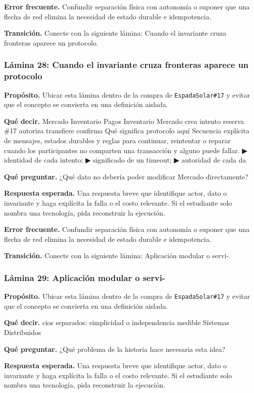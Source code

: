 \documentclass[variant=docente,cover=institutional,mode=screen]{ua-engineering-v6-article}
\begin{document}
\textbf{Error frecuente.} Confundir separación física con autonomía o suponer que una flecha de red elimina la necesidad de estado durable e idempotencia.

\textbf{Transición.} Conecte con la siguiente lámina: Cuando el invariante cruza fronteras aparece un protocolo.

\subsubsection*{Lámina 28: Cuando el invariante cruza fronteras aparece un protocolo}
\textbf{Propósito.} Ubicar esta lámina dentro de la compra de \texttt{EspadaSolar\#17} y evitar que el concepto se convierta en una definición aislada.

\textbf{Qué decir.} Mercado Inventario Pagos Inventario Mercado crea intento reserva \#17 autoriza transfiere confirma Qué significa protocolo aquí Secuencia explícita de mensajes, estados durables y reglas para continuar, reintentar o reparar cuando los participantes no comparten una transacción y alguno puede fallar. ▶ identidad de cada intento; ▶ significado de un timeout; ▶ autoridad de cada da

\textbf{Qué preguntar.} ¿Qué dato no debería poder modificar Mercado directamente?

\textbf{Respuesta esperada.} Una respuesta breve que identifique actor, dato o invariante y haga explícita la falla o el costo relevante. Si el estudiante solo nombra una tecnología, pida reconstruir la ejecución.

\textbf{Error frecuente.} Confundir separación física con autonomía o suponer que una flecha de red elimina la necesidad de estado durable e idempotencia.

\textbf{Transición.} Conecte con la siguiente lámina: Aplicación modular o servi-.

\subsubsection*{Lámina 29: Aplicación modular o servi-}
\textbf{Propósito.} Ubicar esta lámina dentro de la compra de \texttt{EspadaSolar\#17} y evitar que el concepto se convierta en una definición aislada.

\textbf{Qué decir.} cios separados: simplicidad o independencia medible Sistemas Distribuidos

\textbf{Qué preguntar.} ¿Qué problema de la historia hace necesaria esta idea?

\textbf{Respuesta esperada.} Una respuesta breve que identifique actor, dato o invariante y haga explícita la falla o el costo relevante. Si el estudiante solo nombra una tecnología, pida reconstruir la ejecución.
\end{document}
